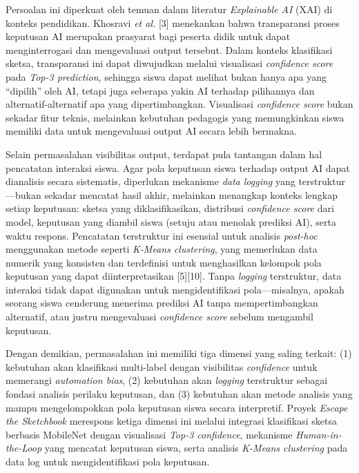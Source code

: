 \documentclass[10pt,twoside,openright]{report}
\begin{document}
Persoalan ini diperkuat oleh temuan dalam literatur \textit{Explainable AI} (XAI) di konteks pendidikan. Khosravi \textit{et al.} [3] menekankan bahwa transparansi proses keputusan AI merupakan prasyarat bagi peserta didik untuk dapat menginterrogasi dan mengevaluasi output tersebut. Dalam konteks klasifikasi sketsa, transparansi ini dapat diwujudkan melalui visualisasi \textit{confidence score} pada \textit{Top-3 prediction}, sehingga siswa dapat melihat bukan hanya apa yang ``dipilih'' oleh AI, tetapi juga seberapa yakin AI terhadap pilihannya dan alternatif-alternatif apa yang dipertimbangkan. Visualisasi \textit{confidence score} bukan sekadar fitur teknis, melainkan kebutuhan pedagogis yang memungkinkan siswa memiliki data untuk mengevaluasi output AI secara lebih bermakna.

Selain permasalahan visibilitas output, terdapat pula tantangan dalam hal pencatatan interaksi siswa. Agar pola keputusan siswa terhadap output AI dapat dianalisis secara sistematis, diperlukan mekanisme \textit{data logging} yang terstruktur—bukan sekadar mencatat hasil akhir, melainkan menangkap konteks lengkap setiap keputusan: sketsa yang diklasifikasikan, distribusi \textit{confidence score} dari model, keputusan yang diambil siswa (setuju atau menolak prediksi AI), serta waktu respons. Pencatatan terstruktur ini esensial untuk analisis \textit{post-hoc} menggunakan metode seperti \textit{K-Means clustering}, yang memerlukan data numerik yang konsisten dan terdefinisi untuk menghasilkan kelompok pola keputusan yang dapat diinterpretasikan [5][10]. Tanpa \textit{logging} terstruktur, data interaksi tidak dapat digunakan untuk mengidentifikasi pola—misalnya, apakah seorang siswa cenderung menerima prediksi AI tanpa mempertimbangkan alternatif, atau justru mengevaluasi \textit{confidence score} sebelum mengambil keputusan.

Dengan demikian, permasalahan ini memiliki tiga dimensi yang saling terkait: (1) kebutuhan akan klasifikasi multi-label dengan visibilitas \textit{confidence} untuk memerangi \textit{automation bias}, (2) kebutuhan akan \textit{logging} terstruktur sebagai fondasi analisis perilaku keputusan, dan (3) kebutuhan akan metode analisis yang mampu mengelompokkan pola keputusan siswa secara interpretif. Proyek \textit{Escape the Sketchbook} merespons ketiga dimensi ini melalui integrasi klasifikasi sketsa berbasis MobileNet dengan visualisasi \textit{Top-3 confidence}, mekanisme \textit{Human-in-the-Loop} yang mencatat keputusan siswa, serta analisis \textit{K-Means clustering} pada data log untuk mengidentifikasi pola keputusan.
\end{document}
